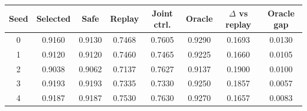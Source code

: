 \begin{tabularx}{\linewidth}{cccccccc}
\toprule
Seed & Selected & Safe & Replay & Joint ctrl. & Oracle & $\Delta$ vs replay & Oracle gap \\
\midrule
0 & 0.9160 & 0.9130 & 0.7468 & 0.7605 & 0.9290 & 0.1693 & 0.0130 \\
1 & 0.9120 & 0.9120 & 0.7460 & 0.7465 & 0.9225 & 0.1660 & 0.0105 \\
2 & 0.9038 & 0.9062 & 0.7137 & 0.7627 & 0.9137 & 0.1900 & 0.0100 \\
3 & 0.9193 & 0.9193 & 0.7335 & 0.7330 & 0.9250 & 0.1857 & 0.0057 \\
4 & 0.9187 & 0.9187 & 0.7530 & 0.7630 & 0.9270 & 0.1657 & 0.0083 \\
\bottomrule
\end{tabularx}